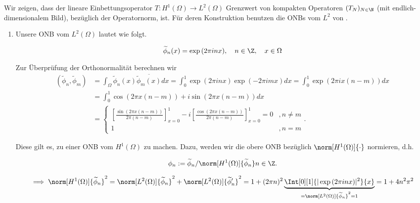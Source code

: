 \begin{solution}

\phantom{}



Wir zeigen, dass der lineare Einbettungsoperator $T: H^1(\Omega) \to L^2(\Omega)$ Grenzwert von kompakten Operatoren $(T_N)_{N \in \N}$ (mit endlich-dimensionalem Bild), bezüglich der Operatornorm, ist.
Für deren Konstruktion benutzen die ONBs vom $L^2$ von \cite[Satz 2.6.6]{Ana3}.

\begin{enumerate}[label = \textbf{\alph*)}]

  \item Unsere ONB vom $L^2(\Omega)$ lautet wie folgt.

  \begin{align*}
    \widetilde{\phi}_n(x) = \exp{(2 \pi i n x)},
    \quad
    n \in \Z,
    \quad
    x \in \Omega
  \end{align*}

  Zur Überprüfung der Orthonormalität berechnen wir
  \begin{align*}
    (\widetilde{\phi}_n, \widetilde{\phi}_m)
    &= \int_\Omega \widetilde{\phi}_n(x) \overline{\widetilde{\phi}_m(x)} dx
    = \int_0^1 \exp(2\pi inx) \exp(-2\pi imx) dx
    = \int_0^1 \exp(2\pi ix(n -m)) dx \\
    &= \int_0^1 \cos(2\pi x(n-m)) + i\sin(2\pi x(n-m)) dx \\
    &=  \begin{cases}\left[\frac{\sin(2\pi x(n-m))}{2\pi(n-m)}\right]_{x=0}^1
    - i\left[\frac{\cos(2\pi x(n-m))}{2\pi(n-m)}\right]_{x=0}^1 = 0 &, n \neq m \\
      1 &, n = m
    \end{cases}.
  \end{align*}

  Diese gilt es, zu einer ONB vom $H^1(\Omega)$ zu machen.
  Dazu, werden wir die obere ONB bezüglich $\norm[H^1(\Omega)]{\cdot}$ normieren, d.h.

  \begin{align*}
    \phi_n
    :=
    \widetilde{\phi}_n
    /
    \norm[H^1(\Omega)]{\widetilde{\phi}_n}
    n \in \Z.
  \end{align*}

  \begin{align*}
    \implies
    \norm[H^1(\Omega)]{\widetilde{\phi}_n}^2
    =
    \norm[L^2(\Omega)]{\widetilde{\phi}_n}^2
    +
    \norm[L^2(\Omega)]{\widetilde{\phi}_n^\prime}^2
    = 1 + (2 \pi n)^2
    \underbrace
    {
      \Int[0][1]{|\exp{(2 \pi i n x)}|^2}{x}
    }_{
      =
      \norm[L^2(\Omega)]{\widetilde{\phi}_n}^2
      =
      1
    } = 1 + 4n^2\pi^2
  \end{align*}


\end{enumerate}
\end{solution}
